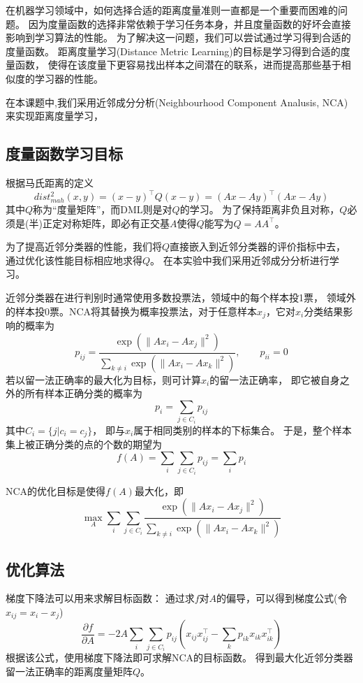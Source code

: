 \documentclass[a4paper,UTF8]{article}
\theoremstyle{definition}
\begin{document}
在机器学习领域中，如何选择合适的距离度量准则一直都是一个重要而困难的问题。
因为度量函数的选择非常依赖于学习任务本身，并且度量函数的好坏会直接影响到学习算法的性能。
为了解决这一问题，我们可以尝试通过学习得到合适的度量函数。
距离度量学习(Distance Metric Learning)的目标是学习得到合适的度量函数，
使得在该度量下更容易找出样本之间潜在的联系，进而提高那些基于相似度的学习器的性能。

在本课题中,我们采用近邻成分分析(Neighbourhood Component Analusis, NCA)来实现距离度量学习，

\subsection*{度量函数学习目标}

根据马氏距离的定义
\[
	dist_{mah}^2(x, y) = (x - y)^\top Q(x - y) = (Ax - Ay)^\top (Ax - Ay)
\]
其中$Q$称为“度量矩阵”，而DML则是对$Q$的学习。
为了保持距离非负且对称，$Q$必须是(半)正定对称矩阵，即必有正交基$A$使得$Q$能写为$Q = AA^\top$。

为了提高近邻分类器的性能，我们将$Q$直接嵌入到近邻分类器的评价指标中去，
通过优化该性能目标相应地求得$Q$。
在本实验中我们采用近邻成分分析进行学习。

近邻分类器在进行判别时通常使用多数投票法，领域中的每个样本投1票，
领域外的样本投0票。NCA将其替换为概率投票法，对于任意样本$x_{j}$，它对$x_{i}$分类结果影响的概率为
\[
	p_{ij} = \frac{\exp(\lVert Ax_{i} - Ax_{j} \rVert^2)}
	{\sum_{k \neq i} \exp(\lVert Ax_{i} - Ax_{k} \rVert^2)}, \qquad
	p_{ii} = 0
\]
若以留一法正确率的最大化为目标，则可计算$x_{i}$的留一法正确率，
即它被自身之外的所有样本正确分类的概率为
\[
	p_{i} = \sum_{j \in C_{i}} p_{ij}
\]
其中$C_{i} = \lbrace j \vert c_{i} = c_{j} \rbrace$，
即与$x_{i}$属于相同类别的样本的下标集合。
于是，整个样本集上被正确分类的点的个数的期望为
\[
	f(A) = \sum_{i} \sum_{j \in C_{i}} p_{ij} = \sum_{i} p_{i}
\]

NCA的优化目标是使得$f(A)$最大化，即
\[
	\max_{A} \sum_{i} \sum_{j \in C_{i}}
	\frac{\exp(\lVert Ax_{i} - Ax_{j} \rVert^2)}
	{\sum_{k \neq i} \exp(\lVert Ax_{i} - Ax_{k} \rVert^2)}
\]

\subsection*{优化算法}

梯度下降法可以用来求解目标函数：
通过求$f$对$A$的偏导，可以得到梯度公式(令$x_{ij} = x_{i} - x_{j}$)
\[
	\frac{\partial f}{\partial A} =
	-2A \sum_{i} \sum_{j \in C_{i}}
	p_{ij}( x_{ij} x_{ij}^\top - \sum_{k} p_{ik} x_{ik} x_{ik}^\top)
\]
根据该公式，使用梯度下降法即可求解NCA的目标函数。
得到最大化近邻分类器留一法正确率的距离度量矩阵$Q$。
\end{document}
